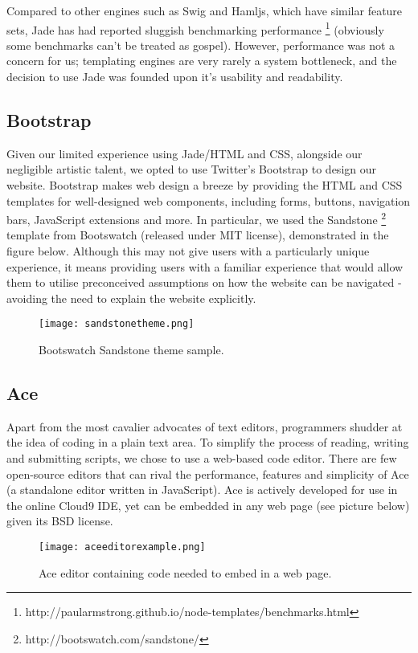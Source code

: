 \noindent Compared to other engines such as Swig and Hamljs, which have similar feature sets, Jade has had reported sluggish benchmarking performance \footnote{http://paularmstrong.github.io/node-templates/benchmarks.html} (obviously some benchmarks can't be treated as gospel). However, performance was not a concern for us; templating engines are very rarely a system bottleneck, and the decision to use Jade was founded upon it's usability and readability.

\subsection{Bootstrap}
Given our limited experience using Jade/HTML and CSS, alongside our negligible artistic talent, we opted to use Twitter's Bootstrap to design our website. Bootstrap makes web design a breeze by providing the HTML and CSS templates for well-designed web components, including forms, buttons, navigation bars, JavaScript extensions and more. In particular, we used the Sandstone \footnote{http://bootswatch.com/sandstone/} template from Bootswatch (released under MIT license), demonstrated in the figure below. Although this may not give users with a particularly unique experience, it means providing users with a familiar experience that would allow them to utilise preconceived assumptions on how the website can be navigated - avoiding the need to explain the website explicitly.

\begin{figure}[H]
\centering
\texttt{[image: sandstonetheme.png]}
\caption{Bootswatch Sandstone theme sample.}
\end{figure}

\subsection{Ace}
Apart from the most cavalier advocates of text editors, programmers shudder at the idea of coding in a plain text area. To simplify the process of reading, writing and submitting scripts, we chose to use a web-based code editor. There are few open-source editors that can rival the performance, features and simplicity of Ace (a standalone editor written in JavaScript). Ace is actively developed for use in the online Cloud9 IDE, yet can be embedded in any web page (see picture below) given its BSD license. 

\begin{figure}[H]
\centering
\texttt{[image: aceeditorexample.png]}
\caption{Ace editor containing code needed to embed in a web page.}
\end{figure}

